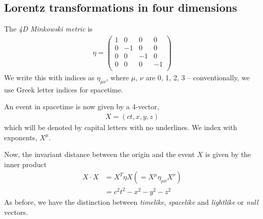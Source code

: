 \documentclass{../../template/note}
\begin{document}
    \subsection{Lorentz transformations in four dimensions}

    \begin{definition}
        The \emph{4D Minkowski metric} is
        \begin{align*}
            \eta = \begin{pmatrix}
             1 & 0 & 0 & 0 \\
             0 & -1 & 0 & 0 \\
             0 & 0 & -1 & 0 \\
             0 & 0 & 0 & -1 \\
            \end{pmatrix}
        \end{align*}
        We write this with indices as \(\eta_{\mu\nu}\), where \(\mu\), \(\nu\) are 0, 1, 2, 3 -- conventionally, we use Greek letter indices for spacetime.
    \end{definition}
    An event in spacetime is now given by a 4-vector,
    \begin{align*}
        X = (ct, x, y, z)
    \end{align*}
    which will be denoted by capital letters with no underlines. We index with exponents, \(X^\mu\).

    Now, the invariant distance between the origin and the event \(X\) is given by the inner product
    \begin{align*}
        X \cdot X &= X^T \eta X (=X^\mu \eta_{\mu\nu} X^\nu) \\
        &= c^2t^2 - x^2 - y^2 - z^2
    \end{align*}
    As before, we have the distinction between \emph{timelike}, \emph{spacelike} and \emph{lightlike} or \emph{null} vectors.
\end{document}
